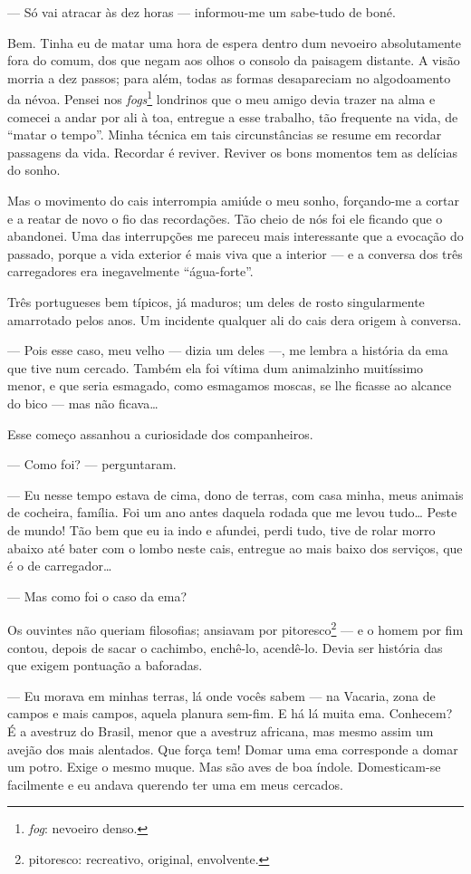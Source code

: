 --- Só vai atracar às dez horas --- informou-me um sabe-tudo de boné.

Bem. Tinha eu de matar uma hora de espera dentro dum nevoeiro
absolutamente fora do comum, dos que negam aos olhos o consolo da
paisagem distante. A visão morria a dez passos; para além, todas as
formas desapareciam no algodoamento da névoa. Pensei nos
\emph{fogs}\footnote{\emph{fog}: nevoeiro denso.} londrinos que o meu
amigo devia trazer na alma e comecei a andar por ali à toa, entregue a
esse trabalho, tão frequente na vida, de ``matar o tempo''. Minha
técnica em tais circunstâncias se resume em recordar passagens da vida.
Recordar é reviver. Reviver os bons momentos tem as delícias do sonho.

Mas o movimento do cais interrompia amiúde o meu sonho, forçando-me a
cortar e a reatar de novo o fio das recordações. Tão cheio de nós foi
ele ficando que o abandonei. Uma das interrupções me pareceu mais
interessante que a evocação do passado, porque a vida exterior é mais
viva que a interior --- e a conversa dos três carregadores era
inegavelmente ``água-forte''.

Três portugueses bem típicos, já maduros; um deles de rosto
singularmente amarrotado pelos anos. Um incidente qualquer ali do cais
dera origem à conversa.

--- Pois esse caso, meu velho --- dizia um deles ---, me lembra a
história da ema que tive num cercado. Também ela foi vítima dum
animalzinho muitíssimo menor, e que seria esmagado, como esmagamos
moscas, se lhe ficasse ao alcance do bico --- mas não ficava\ldots{}

Esse começo assanhou a curiosidade dos companheiros.

--- Como foi? --- perguntaram.

--- Eu nesse tempo estava de cima, dono de terras, com casa minha, meus
animais de cocheira, família. Foi um ano antes daquela rodada que me
levou tudo\ldots{} Peste de mundo! Tão bem que eu ia indo e afundei, perdi
tudo, tive de rolar morro abaixo até bater com o lombo neste cais,
entregue ao mais baixo dos serviços, que é o de carregador\ldots{}

--- Mas como foi o caso da ema?

Os ouvintes não queriam filosofias; ansiavam por pitoresco\footnote{pitoresco:
  recreativo, original, envolvente.} --- e o homem por fim contou,
depois de sacar o cachimbo, enchê-lo, acendê-lo. Devia ser história das
que exigem pontuação a baforadas.

--- Eu morava em minhas terras, lá onde vocês sabem --- na Vacaria, zona
de campos e mais campos, aquela planura sem-fim. E há lá muita ema.
Conhecem? É a avestruz do Brasil, menor que a avestruz africana, mas
mesmo assim um avejão dos mais alentados. Que força tem! Domar uma ema
corresponde a domar um potro. Exige o mesmo muque. Mas são aves de boa
índole. Domesticam-se facilmente e eu andava querendo ter uma em meus
cercados.

